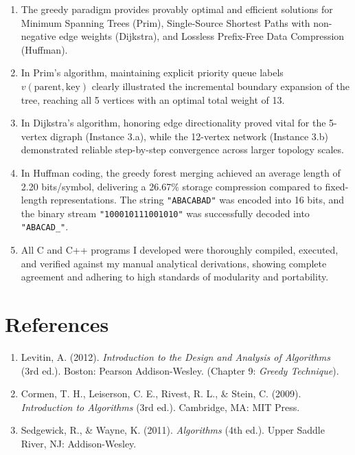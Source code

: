\documentclass[11pt,a4paper]{article}
\begin{document}
\begin{enumerate}
    \item The greedy paradigm provides provably optimal and efficient solutions for Minimum Spanning Trees (Prim), Single-Source Shortest Paths with non-negative edge weights (Dijkstra), and Lossless Prefix-Free Data Compression (Huffman).
    \item In Prim's algorithm, maintaining explicit priority queue labels $v(\text{parent}, \text{key})$ clearly illustrated the incremental boundary expansion of the tree, reaching all 5 vertices with an optimal total weight of 13.
    \item In Dijkstra's algorithm, honoring edge directionality proved vital for the 5-vertex digraph (Instance 3.a), while the 12-vertex network (Instance 3.b) demonstrated reliable step-by-step convergence across larger topology scales.
    \item In Huffman coding, the greedy forest merging achieved an average length of 2.20 bits/symbol, delivering a 26.67\% storage compression compared to fixed-length representations. The string \texttt{"ABACABAD"} was encoded into 16 bits, and the binary stream \texttt{"100010111001010"} was successfully decoded into \texttt{"ABACAD\_"}.
    \item All C and C++ programs I developed were thoroughly compiled, executed, and verified against my manual analytical derivations, showing complete agreement and adhering to high standards of modularity and portability.
\end{enumerate}

\section{References}
\begin{enumerate}
    \item Levitin, A. (2012). \textit{Introduction to the Design and Analysis of Algorithms} (3rd ed.). Boston: Pearson Addison-Wesley. (Chapter 9: \textit{Greedy Technique}).
    \item Cormen, T. H., Leiserson, C. E., Rivest, R. L., \& Stein, C. (2009). \textit{Introduction to Algorithms} (3rd ed.). Cambridge, MA: MIT Press.
    \item Sedgewick, R., \& Wayne, K. (2011). \textit{Algorithms} (4th ed.). Upper Saddle River, NJ: Addison-Wesley.
\end{enumerate}
\end{document}
